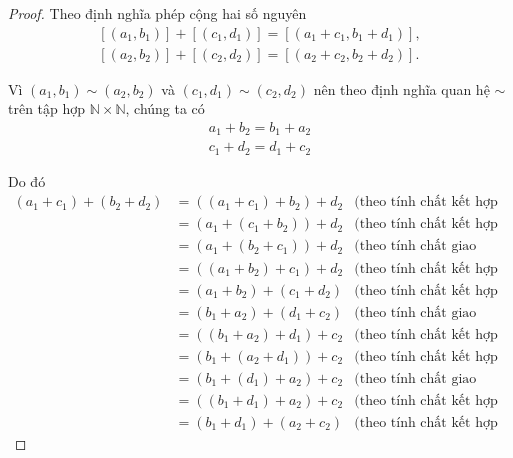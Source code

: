 \begin{proof}
    Theo định nghĩa phép cộng hai số nguyên
    \[
        \begin{split}
            [(a_{1}, b_{1})] + [(c_{1}, d_{1})] = [(a_{1}+c_{1}, b_{1}+d_{1})], \\
            [(a_{2}, b_{2})] + [(c_{2}, d_{2})] = [(a_{2}+c_{2}, b_{2}+d_{2})].
        \end{split}
    \]

    Vì $(a_{1}, b_{1}) \sim (a_{2}, b_{2})$ và $(c_{1}, d_{1})\sim (c_{2}, d_{2})$ nên theo định nghĩa quan hệ $\sim$ trên tập hợp $\mathbb{N}\times\mathbb{N}$, chúng ta có
    \[
        \begin{split}
            a_{1} + b_{2} = b_{1} + a_{2} \\
            c_{1} + d_{2} = d_{1} + c_{2}
        \end{split}
    \]

    Do đó
    \begin{align*}
        (a_{1} + c_{1}) + (b_{2} + d_{2}) & = ((a_{1} + c_{1}) + b_{2}) + d_{2} & \text{(theo tính chất kết hợp của phép cộng số tự nhiên)}   \\
                                          & = (a_{1} + (c_{1} + b_{2})) + d_{2} & \text{(theo tính chất kết hợp của phép cộng số tự nhiên)}   \\
                                          & = (a_{1} + (b_{2} + c_{1})) + d_{2} & \text{(theo tính chất giao hoán của phép cộng số tự nhiên)} \\
                                          & = ((a_{1} + b_{2}) + c_{1}) + d_{2} & \text{(theo tính chất kết hợp của phép cộng số tự nhiên)}   \\
                                          & = (a_{1} + b_{2}) + (c_{1} + d_{2}) & \text{(theo tính chất kết hợp của phép cộng số tự nhiên)}   \\
                                          & = (b_{1} + a_{2}) + (d_{1} + c_{2}) & \text{(theo tính chất giao hoán của phép cộng số tự nhiên)} \\
                                          & = ((b_{1} + a_{2}) + d_{1}) + c_{2} & \text{(theo tính chất kết hợp của phép cộng số tự nhiên)}   \\
                                          & = (b_{1} + (a_{2} + d_{1})) + c_{2} & \text{(theo tính chất kết hợp của phép cộng số tự nhiên)}   \\
                                          & = (b_{1} + (d_{1}) + a_{2}) + c_{2} & \text{(theo tính chất giao hoán của phép cộng số tự nhiên)} \\
                                          & = ((b_{1} + d_{1}) + a_{2}) + c_{2} & \text{(theo tính chất kết hợp của phép cộng số tự nhiên)}   \\
                                          & = (b_{1} + d_{1}) + (a_{2} + c_{2}) & \text{(theo tính chất kết hợp của phép cộng số tự nhiên)}
    \end{align*}


\end{proof}
